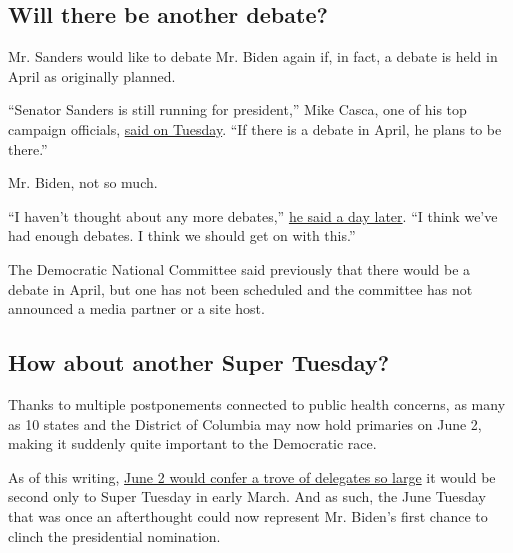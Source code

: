\hypertarget{will-there-be-another-debate}{%
\subsection{Will there be another
debate?}\label{will-there-be-another-debate}}

Mr. Sanders would like to debate Mr. Biden again if, in fact, a debate
is held in April as originally planned.

``Senator Sanders is still running for president,'' Mike Casca, one of
his top campaign officials,
\href{https://www.nytimes.com/2020/03/24/us/politics/biden-sanders-next-democratic-debate.html}{said
on Tuesday}. ``If there is a debate in April, he plans to be there.''

Mr. Biden, not so much.

``I haven't thought about any more debates,''
\href{https://www.nytimes.com/2020/03/25/us/politics/bernie-sanders-joe-biden-next-debate.html}{he
said a day later}. ``I think we've had enough debates. I think we should
get on with this.''

The Democratic National Committee said previously that there would be a
debate in April, but one has not been scheduled and the committee has
not announced a media partner or a site host.

\hypertarget{how-about-another-super-tuesday}{%
\subsection{How about another Super
Tuesday?}\label{how-about-another-super-tuesday}}

Thanks to multiple postponements connected to public health concerns, as
many as 10 states and the District of Columbia may now hold primaries on
June 2, making it suddenly quite important to the Democratic race.

As of this writing,
\href{https://www.nytimes.com/2020/03/25/us/politics/biden-sanders-coronavirus-june-2.html}{June
2 would confer a trove of delegates so large} it would be second only to
Super Tuesday in early March. And as such, the June Tuesday that was
once an afterthought could now represent Mr. Biden's first chance to
clinch the presidential nomination.

